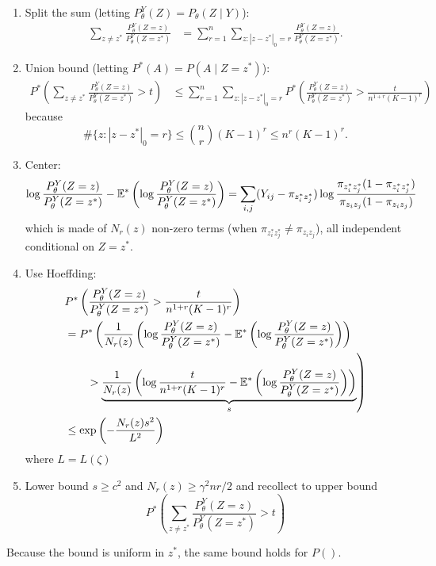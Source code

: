 \begin{enumerate}
 \item Split the sum (letting $P_\theta^Y(Z) = P_\theta(Z \mid Y)$):
 \begin{align*}
 \sum_{z \neq z^*} \frac{P_\theta^Y(Z=z)}{P_\theta^Y(Z=z^*)} 
 & = \sum_{r=1}^n \sum_{z: |z - z^*|_0=r} \frac{P_\theta^Y(Z=z)}{P_\theta^Y(Z=z^*)}.
 \end{align*}
 \item Union bound (letting $P^*(A) = P(A \mid Z=z^*)$):
 \begin{align*}
 P^*\left(\sum_{z \neq z^*} \frac{P_\theta^Y(Z=z)}{P_\theta^Y(Z=z^*)} > t\right)
 & \leq \sum_{r=1}^n \sum_{z: |z - z^*|_0=r} P^*\left(\frac{P_\theta^Y(Z=z)}{P_\theta^Y(Z=z^*)} > \frac{t}{n^{1+r}(K-1)^r}\right)
 \end{align*}
 because 
 $$
 \#\{z: |z - z^*|_0=r\} \leq \binom{n}{r}(K-1)^r \leq n^r(K-1)^r.
 $$
 \item Center:
 \begin{align*}
  \log \frac{P_\theta^Y(Z=z)}{P_\theta^Y(Z=z^*)}
  - \mathbb E^*\left( \log \frac{P_\theta^Y(Z=z)}{P_\theta^Y(Z=z^*)}\right)
  = \sum_{i, j} ({Y_{ij}} - \pi_{z^*_iz^*_j}) \log \frac{\pi_{z^*_i z^*_j} (1 - \pi_{z^*_i z^*_j})}{\pi_{z_i z_j} (1 - \pi_{z_i z_j})}
 \end{align*}
 which is made of $N_r(z)$ non-zero terms (when $\pi_{z^*_i z^*_j} \neq \pi_{z_i z_j}$), all independent conditional on $Z=z^*$.
 \item Use Hoeffding:
 \begin{align*}
  & P^*\left(\frac{P_\theta^Y(Z=z)}{P_\theta^Y(Z=z^*)} > \frac{t}{n^{1+r}(K-1)^r}\right) \\
  & = P^*\left(\frac1{N_r(z)} \left(\log \frac{P_\theta^Y(Z=z)}{P_\theta^Y(Z=z^*)} - \mathbb E^*\left( \log \frac{P_\theta^Y(Z=z)}{P_\theta^Y(Z=z^*)}\right) \right) \right. \\
  & \qquad \left. > \underset{s}{\underbrace{\frac1{N_r(z)} \left(\log \frac{t}{n^{1+r}(K-1)^r} - \mathbb E^*\left( \log \frac{P_\theta^Y(Z=z)}{P_\theta^Y(Z=z^*)}\right)\right)}} \right) \\
  & \leq \exp\left(-\frac{N_r(z) s^2}{L^2}\right)
 \end{align*}
 where $L = L(\zeta)$
 \item Lower bound $s \geq c^2$ and $N_r(z) \geq \gamma^2 n r / 2$ and recollect to upper bound
 $$
 P^*\left(\sum_{z \neq z^*} \frac{P_\theta^Y(Z=z)}{P_\theta^Y(Z=z^*)} > t\right)
 $$
\end{enumerate}

Because the bound is uniform in $z^*$, the same bound holds for $P()$.


